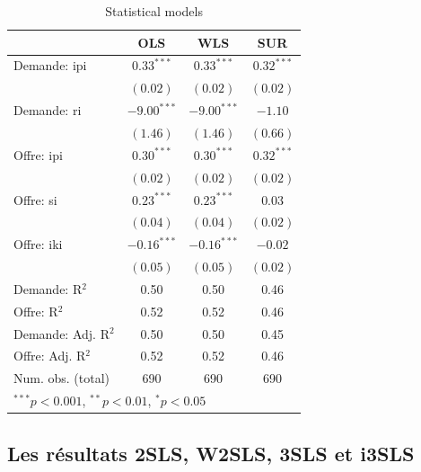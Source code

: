 \documentclass[11pt,]{article}
\begin{document}
\FloatBarrier

\begin{table}[!htbp]
\begin{center}
\begin{tabular}{l c c c }
\hline
 & OLS & WLS & SUR \\
\hline
Demande: ipi        & $0.33^{***}$  & $0.33^{***}$  & $0.32^{***}$ \\
                    & $(0.02)$      & $(0.02)$      & $(0.02)$     \\
Demande: ri         & $-9.00^{***}$ & $-9.00^{***}$ & $-1.10$      \\
                    & $(1.46)$      & $(1.46)$      & $(0.66)$     \\
Offre: ipi          & $0.30^{***}$  & $0.30^{***}$  & $0.32^{***}$ \\
                    & $(0.02)$      & $(0.02)$      & $(0.02)$     \\
Offre: si           & $0.23^{***}$  & $0.23^{***}$  & $0.03$       \\
                    & $(0.04)$      & $(0.04)$      & $(0.02)$     \\
Offre: iki          & $-0.16^{***}$ & $-0.16^{***}$ & $-0.02$      \\
                    & $(0.05)$      & $(0.05)$      & $(0.02)$     \\
\hline
Demande: R$^2$      & 0.50          & 0.50          & 0.46         \\
Offre: R$^2$        & 0.52          & 0.52          & 0.46         \\
Demande: Adj. R$^2$ & 0.50          & 0.50          & 0.45         \\
Offre: Adj. R$^2$   & 0.52          & 0.52          & 0.46         \\
Num. obs. (total)   & 690           & 690           & 690          \\
\hline
\multicolumn{4}{l}{\scriptsize{$^{***}p<0.001$, $^{**}p<0.01$, $^*p<0.05$}}
\end{tabular}
\caption{Statistical models}
\label{table : ols, wls and sur}
\end{center}
\end{table}

\FloatBarrier

\hypertarget{les-resultats-2sls-w2sls-3sls-et-i3sls}{%
\subsection{Les résultats 2SLS, W2SLS, 3SLS et
i3SLS}\label{les-resultats-2sls-w2sls-3sls-et-i3sls}}
\end{document}
